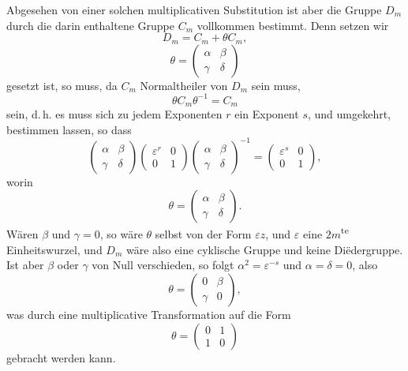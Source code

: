 \documentclass[12pt,a4paper]{article}
\theoremstyle{plain}
\theoremstyle{definition}
\theoremstyle{remark}
\begin{document}
Abgesehen von einer solchen multiplicativen Substitution ist
aber die Gruppe $D_m$ durch die darin enthaltene Gruppe $C_m$
vollkommen bestimmt. Denn setzen wir
\[
D_m = C_m + \theta C_m,
\]
\[
\theta = \begin{pmatrix}\alpha & \beta\\ \gamma & \delta\end{pmatrix}
\]
gesetzt ist, so muss, da $C_m$ Normaltheiler von $D_m$ sein muss,
\[
\theta C_m \theta^{-1} = C_m
\]
sein, d.\,h. es muss sich zu jedem Exponenten $r$ ein Exponent $s$, und umgekehrt, bestimmen lassen, so dass
\begin{equation}\label{eq:55_8}
\begin{pmatrix}\alpha & \beta\\ \gamma & \delta\end{pmatrix}
\begin{pmatrix}\varepsilon^r & 0\\ 0 & 1\end{pmatrix}
\begin{pmatrix}\alpha & \beta\\ \gamma & \delta\end{pmatrix}^{-1}
=
\begin{pmatrix}\varepsilon^s & 0\\ 0 & 1\end{pmatrix},\tag{8}
\end{equation}
worin
\[
\theta = \begin{pmatrix}\alpha & \beta\\ \gamma & \delta\end{pmatrix}.
\]
W\"aren $\beta$ und $\gamma = 0$, so w\"are $\theta$ selbst von der Form $\varepsilon z$,
und $\varepsilon$ eine $2m$\textsuperscript{te} Einheitswurzel, und $D_m$ w\"are also eine cyklische
Gruppe und keine Di\"edergruppe. Ist aber $\beta$ oder $\gamma$ von Null
verschieden, so folgt $\alpha^2 = \varepsilon^{-s}$ und $\alpha = \delta = 0$, also
\[
\theta = \begin{pmatrix}0 & \beta\\ \gamma & 0\end{pmatrix},
\]
was durch eine multiplicative Transformation auf die Form
\[
\theta = \begin{pmatrix}0 & 1\\ 1 & 0\end{pmatrix}
\]
gebracht werden kann.
\end{document}
